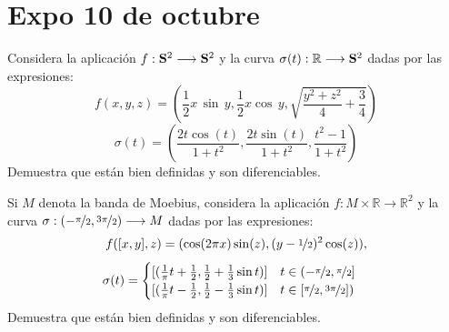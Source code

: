 \section{Expo 10 de octubre}
\begin{ejer}
    [1] Considera la aplicaci\'on $f: \bold S^2 \longrightarrow \bold S^2$ y la curva $\sigma(t): \mathbb R \longrightarrow \bold S^2$ dadas por las expresiones:
$$f(x,y,z)=\left( \dfrac{1}{2} x\, \sin \, y, \dfrac{1}{2}x \cos \, y, \sqrt{\dfrac{y^2+z^2}{4}+\dfrac{3}{4}}\right)$$
$$ \sigma(t) = \left(\dfrac{2t \cos(t)}{1 + t^2} ,\dfrac{2t \sin(t)}{ 1 + t^2}, \dfrac{t^2-1}{1+t^2}\right)$$ Demuestra que est\'an bien definidas y son diferenciables.
\end{ejer}
\begin{ejer}
    [2] Si $M$ denota la banda de Moebius, considera la aplicaci\'on $f : M \times \mathbb R \longrightarrow \mathbb R^2$ y la curva $\sigma : (-\nicefrac{\pi}{2}, \nicefrac{3\pi}{2}) \longrightarrow M$ dadas por las expresiones:
    $$f([x,y],z)=(\cos (2\pi x)\sin(z),(y-\nicefrac{1}{2})^2 \cos(z)),$$
    $$\sigma(t)=\begin{cases}
        [(\frac{1}{\pi}t+\frac{1}{2}, \frac{1}{2}+\frac{1}{3}\sin t)] \quad t \in (-\nicefrac{\pi}{2},\nicefrac{\pi}{2}] \\  [(\frac{1}{\pi}t-\frac{1}{2}, \frac{1}{2}-\frac{1}{3}\sin t)] \quad t \in [\nicefrac{\pi}{2},\nicefrac{3\pi}{2}])
    \end{cases}$$
Demuestra que est\'an bien definidas y son diferenciables.
\end{ejer}
